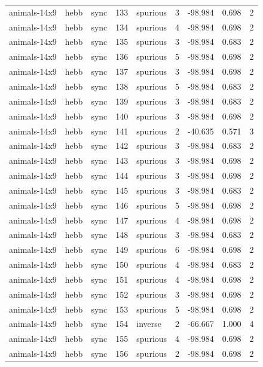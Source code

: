 \begin{tabular}{lllrlrrrr}
animals-14x9 & hebb & sync & 133 & spurious & 3 & -98.984 & 0.698 & 2 \\
animals-14x9 & hebb & sync & 134 & spurious & 4 & -98.984 & 0.698 & 2 \\
animals-14x9 & hebb & sync & 135 & spurious & 3 & -98.984 & 0.683 & 2 \\
animals-14x9 & hebb & sync & 136 & spurious & 5 & -98.984 & 0.698 & 2 \\
animals-14x9 & hebb & sync & 137 & spurious & 3 & -98.984 & 0.698 & 2 \\
animals-14x9 & hebb & sync & 138 & spurious & 5 & -98.984 & 0.683 & 2 \\
animals-14x9 & hebb & sync & 139 & spurious & 3 & -98.984 & 0.683 & 2 \\
animals-14x9 & hebb & sync & 140 & spurious & 3 & -98.984 & 0.698 & 2 \\
animals-14x9 & hebb & sync & 141 & spurious & 2 & -40.635 & 0.571 & 3 \\
animals-14x9 & hebb & sync & 142 & spurious & 3 & -98.984 & 0.683 & 2 \\
animals-14x9 & hebb & sync & 143 & spurious & 3 & -98.984 & 0.698 & 2 \\
animals-14x9 & hebb & sync & 144 & spurious & 3 & -98.984 & 0.698 & 2 \\
animals-14x9 & hebb & sync & 145 & spurious & 3 & -98.984 & 0.683 & 2 \\
animals-14x9 & hebb & sync & 146 & spurious & 5 & -98.984 & 0.698 & 2 \\
animals-14x9 & hebb & sync & 147 & spurious & 4 & -98.984 & 0.698 & 2 \\
animals-14x9 & hebb & sync & 148 & spurious & 3 & -98.984 & 0.683 & 2 \\
animals-14x9 & hebb & sync & 149 & spurious & 6 & -98.984 & 0.698 & 2 \\
animals-14x9 & hebb & sync & 150 & spurious & 4 & -98.984 & 0.683 & 2 \\
animals-14x9 & hebb & sync & 151 & spurious & 4 & -98.984 & 0.698 & 2 \\
animals-14x9 & hebb & sync & 152 & spurious & 3 & -98.984 & 0.698 & 2 \\
animals-14x9 & hebb & sync & 153 & spurious & 5 & -98.984 & 0.698 & 2 \\
animals-14x9 & hebb & sync & 154 & inverse & 2 & -66.667 & 1.000 & 4 \\
animals-14x9 & hebb & sync & 155 & spurious & 4 & -98.984 & 0.698 & 2 \\
animals-14x9 & hebb & sync & 156 & spurious & 2 & -98.984 & 0.698 & 2 \\

\end{tabular}
